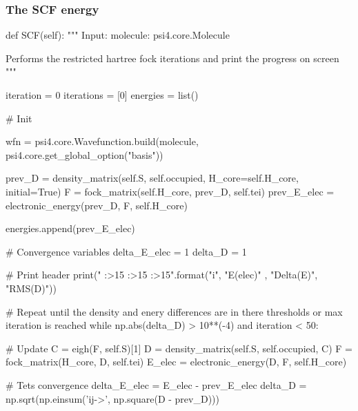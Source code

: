 \documentclass{beamer}
\begin{document}
\begin{frame}[fragile]
    \frametitle{The SCF energy}
    \begin{python}

        def SCF(self):
        """
        Input:
            molecule: psi4.core.Molecule
            
        Performs the restricted hartree fock iterations and print the progress on screen
        """
        
        iteration = 0
        iterations = [0]
        energies = list()
    \end{python}
\end{frame}
\begin{frame}[fragile]
    \begin{python}
   
        # Init
        
        wfn = psi4.core.Wavefunction.build(molecule, psi4.core.get_global_option("basis"))
        
        prev_D = density_matrix(self.S, self.occupied, H_core=self.H_core, initial=True)
        F = fock_matrix(self.H_core, prev_D, self.tei)
        prev_E_elec = electronic_energy(prev_D, F, self.H_core)
        
        energies.append(prev_E_elec)
    \end{python}
\end{frame}
\begin{frame}[fragile]
    \begin{python}
        # Convergence variables
        delta_E_elec = 1
        delta_D = 1
        
        # Print header
        print("{} {:>15} {:>15} {:>15}".format("i", "E(elec)" , "Delta(E)", "RMS(D)"))
        
        # Repeat until the density and enery differences are in there thresholds or max iteration is reached
        while np.abs(delta_D) > 10**(-4) and iteration < 50:
    \end{python}
\end{frame}
\begin{frame}[fragile]
    \begin{python}          
        
            # Update
            C = eigh(F, self.S)[1]
            D = density_matrix(self.S, self.occupied, C)
            F = fock_matrix(H_core, D, self.tei)
            E_elec = electronic_energy(D, F, self.H_core)
    
            # Tets convergence
            delta_E_elec = E_elec - prev_E_elec
            delta_D = np.sqrt(np.einsum('ij->', np.square(D - prev_D)))
        \end{python}
    \end{frame}
\end{document}
